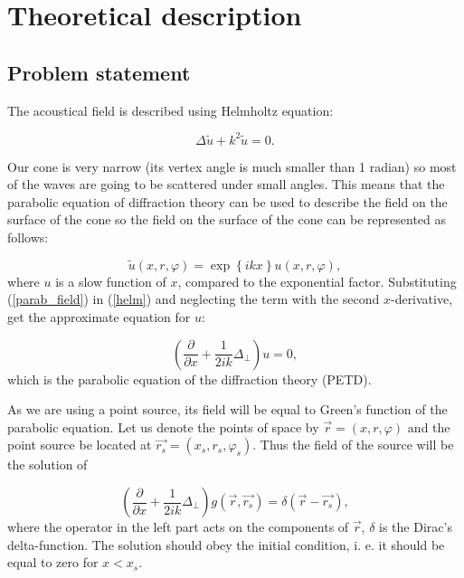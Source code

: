 \documentclass{procDDs}
\begin{document}
\section{Theoretical description}

\subsection{Problem statement}

The acoustical field is described using Helmholtz equation:

\begin{equation}\label{helm}                     
\Delta \tilde{u} + k^2 \tilde{u} = 0.                                         
\end{equation}

Our cone is very narrow (its vertex angle is much smaller than 1 radian) so most of the waves are going to be scattered under small angles. This means that the parabolic equation of diffraction theory can be used to describe the field on the surface of the cone so the field on the surface of the cone can be represented as follows:

\begin{equation}\label{parab_field}                     
\tilde{u}(x,r,\varphi)=\exp\left\lbrace ikx \right\rbrace u(x,r,\varphi),                                         
\end{equation}
where $u$ is a slow function of $x$, compared to the exponential factor. Substituting (\ref{parab_field}) in (\ref{helm}) and neglecting the term with the second $x$-derivative, get the approximate equation for $u$:

\begin{equation}\label{parab_eqn}                     
\left( \frac{\partial}{\partial x} + \frac{1}{2ik} \Delta_\perp \right) u = 0,                                 
\end{equation}
which is the parabolic equation of the diffraction theory (PETD).

As we are using a point source, its field will be equal to Green's function of the parabolic equation. Let us denote the points of space by $\vec{r} = (x, r, \varphi)$ and the point source be located at $\vec{r_s} = (x_s, r_s, \varphi_s)$. Thus the field of the source will be the solution of

\begin{equation}\label{greens_eqn}                     
\left(  \frac{\partial}{\partial x} + \frac{1}{2ik} \Delta_\perp \right) g(\vec{r}, \vec{r_s}) = \delta(\vec{r} - \vec{r_s}),                                 
\end{equation}
where the operator in the left part acts on the components of $\vec{r}$, $\delta$ is the Dirac's delta-function. The solution should obey the initial condition, i. e. it should be equal to zero for $x < x_s$.
\end{document}
